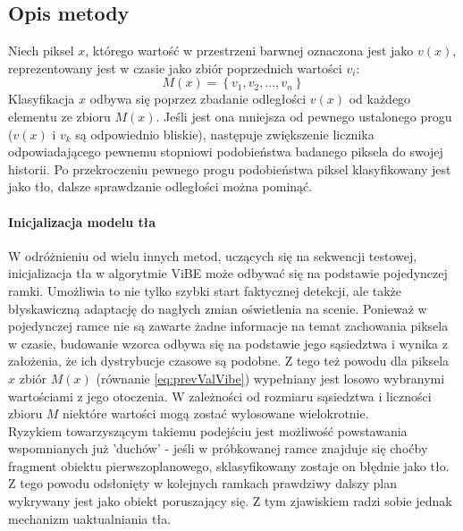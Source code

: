 \subsection{Opis metody}
Niech piksel $x$, którego wartość w przestrzeni barwnej oznaczona jest jako $v(x)$, reprezentowany jest w czasie jako zbiór poprzednich wartości $v_{i}$:
\begin{equation}
\label{eq:prevValVibe}
M(x) = \left\{v_{1}, v_{2}, ..., v_{n}\right\}
\end{equation}
Klasyfikacja $x$ odbywa się poprzez zbadanie odległości $v(x)$ od każdego elementu ze zbioru $M(x)$. Jeśli jest ona mniejsza od pewnego ustalonego progu ($v(x)$ i $v_{k}$ są odpowiednio bliskie), następuje zwiększenie licznika odpowiadającego pewnemu stopniowi podobieństwa badanego piksela do swojej historii. Po przekroczeniu pewnego progu podobieństwa piksel klasyfikowany jest jako tło, dalsze sprawdzanie odległości można pominąć.
\paragraph{Inicjalizacja modelu tła \\}
W odróżnieniu od wielu innych metod, uczących się na sekwencji testowej, inicjalizacja tła w algorytmie ViBE może odbywać się na podstawie pojedynczej ramki. Umożliwia to nie tylko szybki start faktycznej detekcji, ale także błyskawiczną adaptację do nagłych zmian oświetlenia na scenie. Ponieważ w pojedynczej ramce nie są zawarte żadne informacje na temat zachowania piksela w czasie, budowanie wzorca odbywa się na podstawie jego sąsiedztwa i wynika z założenia, że ich dystrybucje czasowe są podobne. Z tego też powodu dla piksela $x$ zbiór $M(x)$ (równanie \ref{eq:prevValVibe}) wypełniany jest losowo wybranymi wartościami z jego otoczenia. W zależności od rozmiaru sąsiedztwa i liczności zbioru $M$ niektóre wartości mogą zostać wylosowane wielokrotnie.\\
Ryzykiem towarzyszącym takiemu podejściu jest możliwość powstawania wspomnianych już 'duchów' - jeśli w próbkowanej ramce znajduje się choćby fragment obiektu pierwszoplanowego, sklasyfikowany zostaje on błędnie jako tło. Z tego powodu odsłonięty w kolejnych ramkach prawdziwy dalszy plan wykrywany jest jako obiekt poruszający się. Z tym zjawiskiem radzi sobie jednak mechanizm uaktualniania tła.
